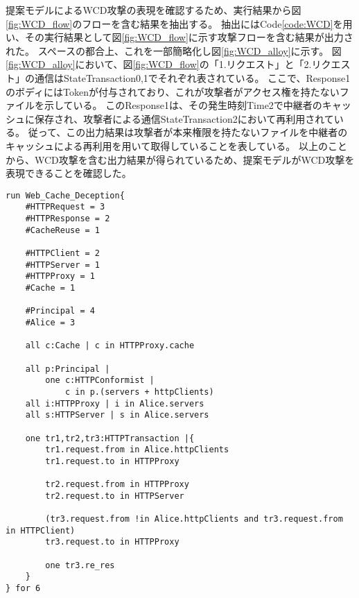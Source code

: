 \documentclass[journal]{IEEEtran}
\begin{document}

提案モデルによるWCD攻撃の表現を確認するため、実行結果から図\ref{fig:WCD_flow}のフローを含む結果を抽出する。
抽出にはCode\ref{code:WCD}を用い、その実行結果として図\ref{fig:WCD_flow}に示す攻撃フローを含む結果が出力された。
スペースの都合上、これを一部簡略化し図\ref{fig:WCD_alloy}に示す。
図\ref{fig:WCD_alloy}において、図\ref{fig:WCD_flow}の「1.リクエスト」と「2.リクエスト」の通信はStateTransaction0,1でそれぞれ表されている。
ここで、Response1のボディにはTokenが付与されており、これが攻撃者がアクセス権を持たないファイルを示している。
このResponse1は、その発生時刻Time2で中継者のキャッシュに保存され、攻撃者による通信StateTransaction2において再利用されている。
従って、この出力結果は攻撃者が本来権限を持たないファイルを中継者のキャッシュによる再利用を用いて取得していることを表している。
以上のことから、WCD攻撃を含む出力結果が得られているため、提案モデルがWCD攻撃を表現できることを確認した。

\begin{lstlisting}[caption=WCD攻撃の表現, label=code:WCD]
run Web_Cache_Deception{
	#HTTPRequest = 3
	#HTTPResponse = 2
	#CacheReuse = 1

	#HTTPClient = 2
	#HTTPServer = 1
	#HTTPProxy = 1
	#Cache = 1

	#Principal = 4
	#Alice = 3

	all c:Cache | c in HTTPProxy.cache

	all p:Principal |
		one c:HTTPConformist |
			c in p.(servers + httpClients)
	all i:HTTPProxy | i in Alice.servers
	all s:HTTPServer | s in Alice.servers

	one tr1,tr2,tr3:HTTPTransaction |{
		tr1.request.from in Alice.httpClients
		tr1.request.to in HTTPProxy

		tr2.request.from in HTTPProxy
		tr2.request.to in HTTPServer

		(tr3.request.from !in Alice.httpClients and tr3.request.from in HTTPClient)
		tr3.request.to in HTTPProxy

		one tr3.re_res
	}
} for 6
\end{lstlisting}

\end{document}
